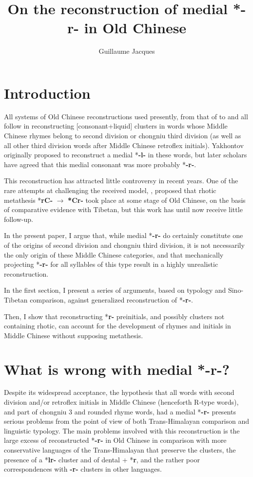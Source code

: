 \documentclass[oneside,a4paper,11pt]{article}
\newcommand{\ipa}[1]{{\phon\mbox{\textbf{#1}}}}
\newcommand{\change}[2]{*\ipa{#1} $\rightarrow$ \ipa{#2}}
\begin{document}
 
\title{On the reconstruction of medial *-r- in Old Chinese}
\author{Guillaume Jacques}
\maketitle
 
\sloppy
\section{Introduction}
All systems of Old Chinese reconstructions used  presently, from that of \citealt{li71oc} to \citet{schuessler09minimal} and \citet{bs14oc} all follow \citet{yakhontov61sochetaniya} in reconstructing [consonant+liquid] clusters in words whose Middle Chinese rhymes belong to second division or chongniu third division (as well as all other third division words after Middle Chinese retroflex initials). Yakhontov originally proposed to reconstruct a medial *\ipa{-l-} in these words, but later scholars have agreed that this medial consonant was more probably *\ipa{-r-}.

This reconstruction has attracted little controversy in recent years. One of the rare attempts at challenging the received model,  \citet{handel02r}, proposed that rhotic metathesis \change{rC-}{*Cr-}  took place at some stage of Old Chinese, on the basis of comparative evidence with Tibetan, but this work has until now receive little follow-up.

In the present paper, I argue that, while medial *\ipa{-r-} do certainly constitute one of the origins of  second division and chongniu third division, it is not necessarily the only origin of these Middle Chinese categories, and that mechanically projecting *\ipa{-r-} for all syllables of this type result in a highly unrealistic reconstruction.

In the first section, I present a series of arguments, based on typology and Sino-Tibetan comparison, against generalized reconstruction of *\ipa{-r-}.

Then, I show that reconstructing *\ipa{r-} preinitials, and possibly clusters not containing rhotic, can account for the development of rhymes and initials in Middle Chinese without supposing metathesis.

\section{What is wrong with medial *\ipa{-r-}?} \label{sec:medial}
Despite its widespread acceptance, the hypothesis that all words with second division and/or retroflex initials in Middle Chinese (henceforth R-type words), and part of chongniu 3 and rounded rhyme words, had a medial *\ipa{-r-} presents serious problems from the point of view of both Trans-Himalayan comparison and linguistic typology. The main problems involved with this reconstruction is the large excess of reconstructed *\ipa{-r-} in Old Chinese in comparison with more conservative languages of the Trans-Himalayan that preserve the clusters, the presence of a *\ipa{lr-} cluster and of dental + *\ipa{r}, and the rather poor correspondences with \ipa{-r-} clusters in other languages.
\end{document}
